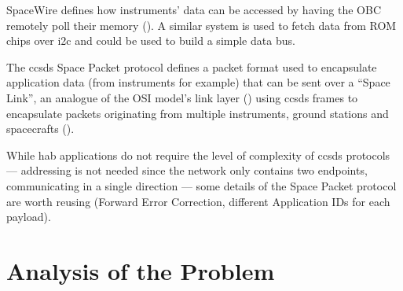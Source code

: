 SpaceWire defines how instruments' data can be accessed by having the OBC
remotely poll their memory (\cite{parkes2005}). A similar system is used to
fetch data from ROM chips over \acrshort{i2c} and could be used to build a
simple data bus.

The \acrshort{ccsds} Space Packet protocol defines a packet format used to
encapsulate application data (from instruments for example) that can be sent
over a ``Space Link'', an analogue of the OSI model's link layer
(\cite{Stallings1987}) using \acrshort{ccsds} frames to encapsulate packets
originating from multiple instruments, ground stations and spacecrafts
(\cite{ccsds2003}).

While \acrshort{hab} applications do not require the level of complexity of
\acrshort{ccsds} protocols — addressing is not needed since the network only
contains two endpoints, communicating in a single direction — some details of
the Space Packet protocol are worth reusing (Forward Error Correction,
different Application IDs for each payload).

\section{Analysis of the Problem}